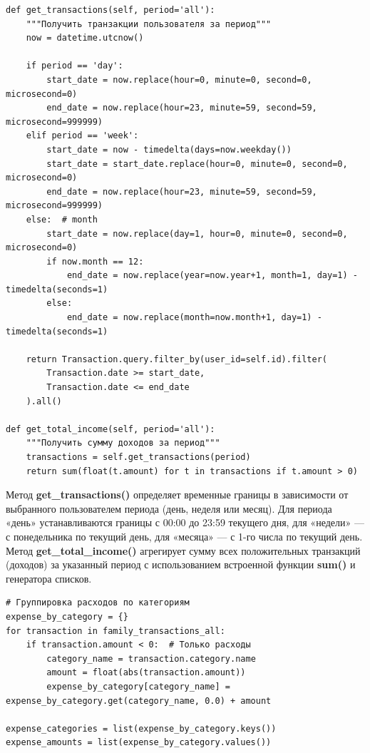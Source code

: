 \begin{lstlisting}[caption=Листинг 3.1 — Фильтрация транзакций по периоду и расчёт доходов, label=lst:transactions]
def get_transactions(self, period='all'):
    """Получить транзакции пользователя за период"""
    now = datetime.utcnow()
    
    if period == 'day':
        start_date = now.replace(hour=0, minute=0, second=0, microsecond=0)
        end_date = now.replace(hour=23, minute=59, second=59, microsecond=999999)
    elif period == 'week':
        start_date = now - timedelta(days=now.weekday())
        start_date = start_date.replace(hour=0, minute=0, second=0, microsecond=0)
        end_date = now.replace(hour=23, minute=59, second=59, microsecond=999999)
    else:  # month
        start_date = now.replace(day=1, hour=0, minute=0, second=0, microsecond=0)
        if now.month == 12:
            end_date = now.replace(year=now.year+1, month=1, day=1) - timedelta(seconds=1)
        else:
            end_date = now.replace(month=now.month+1, day=1) - timedelta(seconds=1)
    
    return Transaction.query.filter_by(user_id=self.id).filter(
        Transaction.date >= start_date,
        Transaction.date <= end_date
    ).all()

def get_total_income(self, period='all'):
    """Получить сумму доходов за период"""
    transactions = self.get_transactions(period)
    return sum(float(t.amount) for t in transactions if t.amount > 0)
\end{lstlisting}

Метод \textbf{get\_transactions()} определяет временные границы в зависимости от выбранного пользователем периода (день, неделя или месяц). Для периода «день» устанавливаются границы с 00:00 до 23:59 текущего дня, для «недели» — с понедельника по текущий день, для «месяца» — с 1-го числа по текущий день. Метод \textbf{get\_total\_income()} агрегирует сумму всех положительных транзакций (доходов) за указанный период с использованием встроенной функции \textbf{sum()} и генератора списков.

\begin{lstlisting}[caption=Листинг 3.2 — Группировка расходов по категориям, label=lst:expenses]
# Группировка расходов по категориям
expense_by_category = {}
for transaction in family_transactions_all:
    if transaction.amount < 0:  # Только расходы
        category_name = transaction.category.name
        amount = float(abs(transaction.amount))
        expense_by_category[category_name] = expense_by_category.get(category_name, 0.0) + amount

expense_categories = list(expense_by_category.keys())
expense_amounts = list(expense_by_category.values())
\end{lstlisting}

